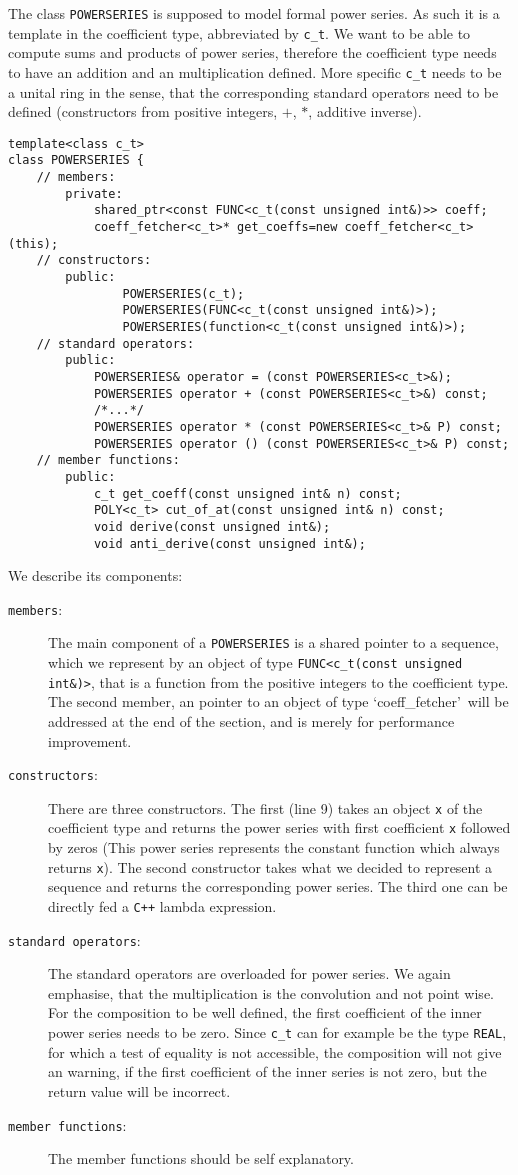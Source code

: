 \documentclass{article}
\newcommand{\cc}{\texttt{C++}\xspace}
\newcommand{\ir}[1]{\texttt{#1}}
\newcommand{\code}[1]{\texttt{#1}}
\newcommand{\func}[1]{\texttt{#1}}
\begin{document}
The class \func{POWERSERIES} is supposed to model formal power series. As such it is a template in the coefficient type, abbreviated by \code{c\_t}. We want to be able to compute sums and products of power series, therefore the coefficient type needs to have an addition and an multiplication defined. More specific \code{c\_t} needs to be a unital ring in the sense, that the corresponding standard operators need to be defined (constructors from positive integers, $+$, $*$, additive inverse). 
\begin{lstlisting}
template<class c_t>
class POWERSERIES {
	// members:
		private:
			shared_ptr<const FUNC<c_t(const unsigned int&)>> coeff;
			coeff_fetcher<c_t>* get_coeffs=new coeff_fetcher<c_t>(this);
	// constructors:
		public:
				POWERSERIES(c_t);
				POWERSERIES(FUNC<c_t(const unsigned int&)>);
				POWERSERIES(function<c_t(const unsigned int&)>);
	// standard operators:
		public:
			POWERSERIES& operator = (const POWERSERIES<c_t>&);
			POWERSERIES operator + (const POWERSERIES<c_t>&) const;
			/*...*/
			POWERSERIES operator * (const POWERSERIES<c_t>& P) const;
			POWERSERIES operator () (const POWERSERIES<c_t>& P) const; 
	// member functions:
		public:
			c_t get_coeff(const unsigned int& n) const;
			POLY<c_t> cut_of_at(const unsigned int& n) const;
			void derive(const unsigned int&);
			void anti_derive(const unsigned int&);	
\end{lstlisting}
We describe its components:
\begin{description}
\item[\code{members}:] The main component of a \func{POWERSERIES} is a shared pointer to a sequence, which we represent by an object of type \func{FUNC<c\_t(const unsigned int\&)>}, that is a function from the positive integers to the coefficient type. The second member, an pointer to an object of type \lq coeff\_fetcher\rq\ will be addressed at the end of the section, and is merely for performance improvement.
\item[\code{constructors}:] There are three constructors. The first (line 9) takes an object \code{x} of the coefficient type and returns the power series with first coefficient \code{x} followed by zeros (This power series represents the constant function which always returns \code{x}). The second constructor takes what we decided to represent a sequence and returns the corresponding power series. The third one can be directly fed a \cc lambda expression.
\item[\code{standard operators}:] The standard operators are overloaded for power series. We again emphasise, that the multiplication is the convolution and not point wise. For the composition to be well defined, the first coefficient of the inner power series needs to be zero. Since \code{c\_t} can for example be the type \ir{REAL}, for which a test of equality is not accessible, the composition will not give an warning, if the first coefficient of the inner series is not zero, but the return value will be incorrect.
\item[\code{member functions}:] The member functions should be self explanatory.
\end{description}
\end{document}
